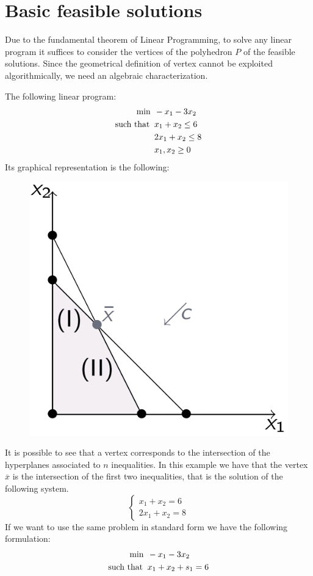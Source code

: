\documentclass[12pt, a4paper]{report}
\begin{document}
    \section{Basic feasible solutions}
    Due to the fundamental theorem of Linear Programming, to solve any linear program it suffices to consider the vertices of the polyhedron $P$ of the feasible solutions.
    Since the geometrical definition of vertex cannot be exploited algorithmically, we need an algebraic characterization. 
    \begin{example}
        The following linear program:
        \begin{align*}
            \min                      \:&\: -x_1-3x_2          \\
            \textnormal{such that }     &\: x_1+x_2 \leq 6  \\
                                        &\: 2x_1+x_2 \leq 8  \\
                                        &\: x_1,x_2 \geq 0
        \end{align*}
        Its graphical representation is the following: 
        \begin{figure}[H]
            \centering
            \includegraphics[width=0.25\linewidth]{images/lp.png}
        \end{figure}
        It is possible to see that a vertex corresponds to the intersection of the hyperplanes associated to $n$ inequalities. In this example
        we have that the vertex $\overline{x}$ is the intersection of the first two inequalities, that is the solution of the following system.
        \[
        \begin{cases}
            x_1+x_2=6 \\
            2x_1+x_2=8
        \end{cases}
        \]
        If we want to use the same problem in standard form we have the following formulation: 
        \begin{align*}
            \min                      \:&\: -x_1-3x_2          \\
            \textnormal{such that }     &\: x_1+x_2+s_1 = 6  \\

\end{align*}
\end{example}
\end{document}
